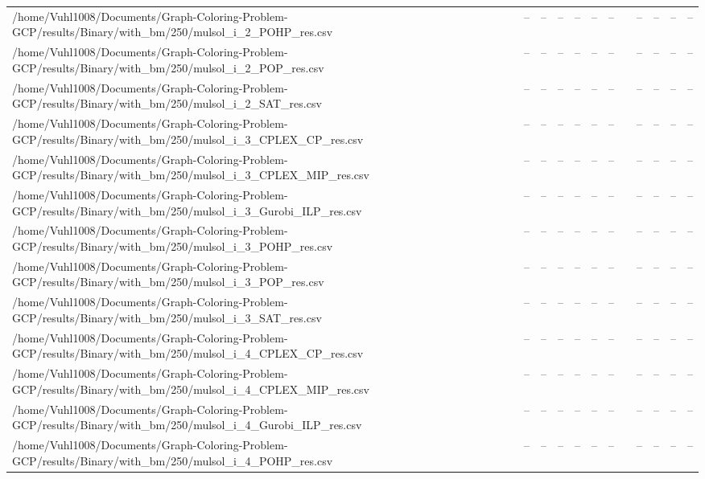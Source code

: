 \begin{table}[htbp]
\begin{tabular}{llllllllllll}
/home/Vuhl1008/Documents/Graph-Coloring-Problem-GCP/results/Binary/with\_bm/250/mulsol\_i\_2\_POHP\_res.csv & -- & -- & -- & -- & -- & -- & {} & -- & -- & -- & -- \\
/home/Vuhl1008/Documents/Graph-Coloring-Problem-GCP/results/Binary/with\_bm/250/mulsol\_i\_2\_POP\_res.csv & -- & -- & -- & -- & -- & -- & {} & -- & -- & -- & -- \\
/home/Vuhl1008/Documents/Graph-Coloring-Problem-GCP/results/Binary/with\_bm/250/mulsol\_i\_2\_SAT\_res.csv & -- & -- & -- & -- & -- & -- & {} & -- & -- & -- & -- \\
/home/Vuhl1008/Documents/Graph-Coloring-Problem-GCP/results/Binary/with\_bm/250/mulsol\_i\_3\_CPLEX\_CP\_res.csv & -- & -- & -- & -- & -- & -- & {} & -- & -- & -- & -- \\
/home/Vuhl1008/Documents/Graph-Coloring-Problem-GCP/results/Binary/with\_bm/250/mulsol\_i\_3\_CPLEX\_MIP\_res.csv & -- & -- & -- & -- & -- & -- & {} & -- & -- & -- & -- \\
/home/Vuhl1008/Documents/Graph-Coloring-Problem-GCP/results/Binary/with\_bm/250/mulsol\_i\_3\_Gurobi\_ILP\_res.csv & -- & -- & -- & -- & -- & -- & {} & -- & -- & -- & -- \\
/home/Vuhl1008/Documents/Graph-Coloring-Problem-GCP/results/Binary/with\_bm/250/mulsol\_i\_3\_POHP\_res.csv & -- & -- & -- & -- & -- & -- & {} & -- & -- & -- & -- \\
/home/Vuhl1008/Documents/Graph-Coloring-Problem-GCP/results/Binary/with\_bm/250/mulsol\_i\_3\_POP\_res.csv & -- & -- & -- & -- & -- & -- & {} & -- & -- & -- & -- \\
/home/Vuhl1008/Documents/Graph-Coloring-Problem-GCP/results/Binary/with\_bm/250/mulsol\_i\_3\_SAT\_res.csv & -- & -- & -- & -- & -- & -- & {} & -- & -- & -- & -- \\
/home/Vuhl1008/Documents/Graph-Coloring-Problem-GCP/results/Binary/with\_bm/250/mulsol\_i\_4\_CPLEX\_CP\_res.csv & -- & -- & -- & -- & -- & -- & {} & -- & -- & -- & -- \\
/home/Vuhl1008/Documents/Graph-Coloring-Problem-GCP/results/Binary/with\_bm/250/mulsol\_i\_4\_CPLEX\_MIP\_res.csv & -- & -- & -- & -- & -- & -- & {} & -- & -- & -- & -- \\
/home/Vuhl1008/Documents/Graph-Coloring-Problem-GCP/results/Binary/with\_bm/250/mulsol\_i\_4\_Gurobi\_ILP\_res.csv & -- & -- & -- & -- & -- & -- & {} & -- & -- & -- & -- \\
/home/Vuhl1008/Documents/Graph-Coloring-Problem-GCP/results/Binary/with\_bm/250/mulsol\_i\_4\_POHP\_res.csv & -- & -- & -- & -- & -- & -- & {} & -- & -- & -- & -- \\

\end{tabular}
\end{table}
